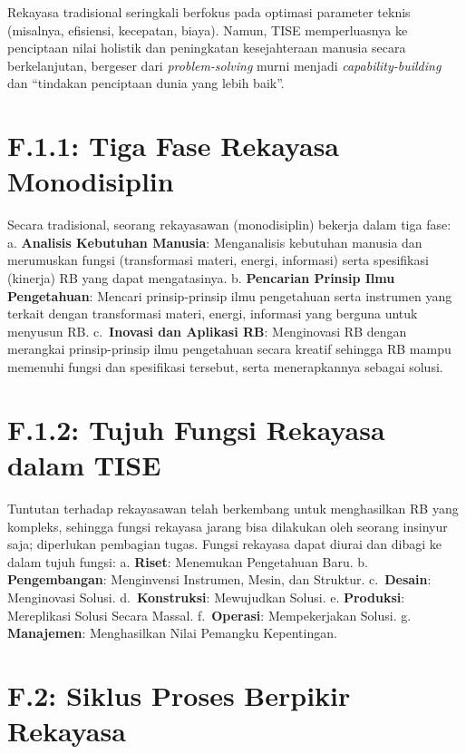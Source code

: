 \documentclass[
  letterpaper,
  DIV=11,
  numbers=noendperiod]{scrreprt}
\begin{document}
Rekayasa tradisional seringkali berfokus pada optimasi parameter teknis
(misalnya, efisiensi, kecepatan, biaya). Namun, TISE memperluasnya ke
penciptaan nilai holistik dan peningkatan kesejahteraan manusia secara
berkelanjutan, bergeser dari \emph{problem-solving} murni menjadi
\emph{capability-building} dan ``tindakan penciptaan dunia yang lebih
baik''.

\section{\texorpdfstring{\textbf{F.1.1: Tiga Fase Rekayasa
Monodisiplin}}{F.1.1: Tiga Fase Rekayasa Monodisiplin}}\label{f.1.1-tiga-fase-rekayasa-monodisiplin}

Secara tradisional, seorang rekayasawan (monodisiplin) bekerja dalam
tiga fase: a. \textbf{Analisis Kebutuhan Manusia}: Menganalisis
kebutuhan manusia dan merumuskan fungsi (transformasi materi, energi,
informasi) serta spesifikasi (kinerja) RB yang dapat mengatasinya. b.
\textbf{Pencarian Prinsip Ilmu Pengetahuan}: Mencari prinsip-prinsip
ilmu pengetahuan serta instrumen yang terkait dengan transformasi
materi, energi, informasi yang berguna untuk menyusun RB.
c.~\textbf{Inovasi dan Aplikasi RB}: Menginovasi RB dengan merangkai
prinsip-prinsip ilmu pengetahuan secara kreatif sehingga RB mampu
memenuhi fungsi dan spesifikasi tersebut, serta menerapkannya sebagai
solusi.

\section{\texorpdfstring{\textbf{F.1.2: Tujuh Fungsi Rekayasa dalam
TISE}}{F.1.2: Tujuh Fungsi Rekayasa dalam TISE}}\label{f.1.2-tujuh-fungsi-rekayasa-dalam-tise}

Tuntutan terhadap rekayasawan telah berkembang untuk menghasilkan RB
yang kompleks, sehingga fungsi rekayasa jarang bisa dilakukan oleh
seorang insinyur saja; diperlukan pembagian tugas. Fungsi rekayasa dapat
diurai dan dibagi ke dalam tujuh fungsi: a. \textbf{Riset}: Menemukan
Pengetahuan Baru. b. \textbf{Pengembangan}: Menginvensi Instrumen,
Mesin, dan Struktur. c.~\textbf{Desain}: Menginovasi Solusi.
d.~\textbf{Konstruksi}: Mewujudkan Solusi. e. \textbf{Produksi}:
Mereplikasi Solusi Secara Massal. f.~\textbf{Operasi}: Mempekerjakan
Solusi. g. \textbf{Manajemen}: Menghasilkan Nilai Pemangku Kepentingan.

\section{\texorpdfstring{\textbf{F.2: Siklus Proses Berpikir
Rekayasa}}{F.2: Siklus Proses Berpikir Rekayasa}}\label{f.2-siklus-proses-berpikir-rekayasa}
\end{document}

